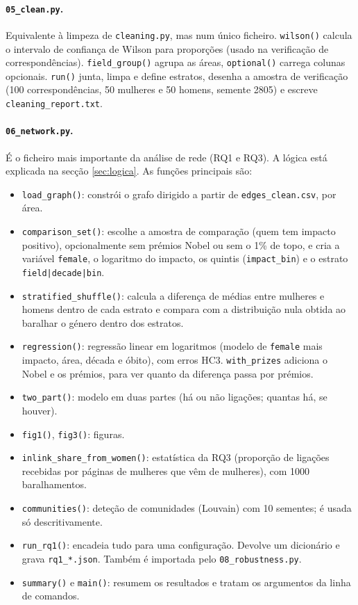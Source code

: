 \documentclass[11pt,a4paper]{article}
\newcommand{\file}[1]{\texttt{#1}}
\newcommand{\fn}[1]{\texttt{#1()}}
\begin{document}
\paragraph{\file{05_clean.py}.} Equivalente à limpeza de \file{cleaning.py}, mas num único ficheiro. \fn{wilson} calcula o intervalo de confiança de Wilson para proporções (usado na verificação de correspondências). \fn{field_group} agrupa as áreas, \fn{optional} carrega colunas opcionais. \fn{run} junta, limpa e define estratos, desenha a amostra de verificação (100 correspondências, 50 mulheres e 50 homens, semente 2805) e escreve \file{cleaning_report.txt}.

\paragraph{\file{06_network.py}.} É o ficheiro mais importante da análise de rede (RQ1 e RQ3). A lógica está explicada na secção \ref{sec:logica}. As funções principais são:
\begin{itemize}
  \item \fn{load_graph}: constrói o grafo dirigido a partir de \file{edges_clean.csv}, por área.
  \item \fn{comparison_set}: escolhe a amostra de comparação (quem tem impacto positivo), opcionalmente sem prémios Nobel ou sem o 1\% de topo, e cria a variável \texttt{female}, o logaritmo do impacto, os quintis (\texttt{impact\_bin}) e o estrato \texttt{field|decade|bin}.
  \item \fn{stratified_shuffle}: calcula a diferença de médias entre mulheres e homens dentro de cada estrato e compara com a distribuição nula obtida ao baralhar o género dentro dos estratos.
  \item \fn{regression}: regressão linear em logaritmos (modelo de \texttt{female} mais impacto, área, década e óbito), com erros HC3. \texttt{with\_prizes} adiciona o Nobel e os prémios, para ver quanto da diferença passa por prémios.
  \item \fn{two_part}: modelo em duas partes (há ou não ligações; quantas há, se houver).
  \item \fn{fig1}, \fn{fig3}: figuras.
  \item \fn{inlink_share_from_women}: estatística da RQ3 (proporção de ligações recebidas por páginas de mulheres que vêm de mulheres), com 1000 baralhamentos.
  \item \fn{communities}: deteção de comunidades (Louvain) com 10 sementes; é usada só descritivamente.
  \item \fn{run_rq1}: encadeia tudo para uma configuração. Devolve um dicionário e grava \file{rq1_*.json}. Também é importada pelo \file{08_robustness.py}.
  \item \fn{summary} e \fn{main}: resumem os resultados e tratam os argumentos da linha de comandos.
\end{itemize}
\end{document}
